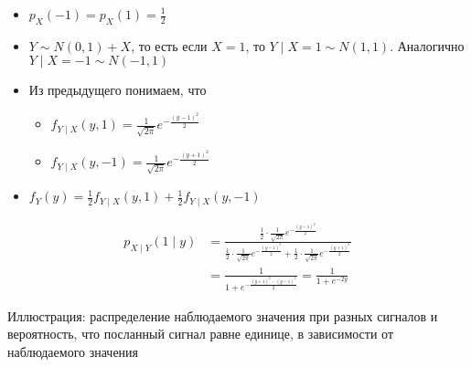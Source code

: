 \documentclass[12pt]{article}
\begin{document}
\begin{itemize}
  \item $p_X(-1) = p_X(1) = \frac{1}{2}$
  \item $Y \sim N(0, 1) + X$, то есть если $X = 1$, то $Y\mid X = 1 \sim N(1, 1)$. Аналогично $Y \mid X = -1 \sim N(-1, 1)$
  \item Из предыдущего понимаем, что 
  \begin{itemize}
    \item $f_{Y \mid X}(y, 1) = \frac{1}{\sqrt{2\pi}} e^{-\frac{(y - 1)^2}{2}}$
    \item $f_{Y \mid X}(y, -1) = \frac{1}{\sqrt{2\pi}} e^{-\frac{(y + 1)^2}{2}}$
  \end{itemize}
  \item $f_{Y}(y) = \frac{1}{2}f_{Y \mid X}(y, 1) + \frac{1}{2} f_{Y \mid X}(y, -1)$
\end{itemize}
\begin{align*}
  p_{X \mid Y}(1 \mid y) &= \frac{\frac{1}{2} \cdot \frac{1}{\sqrt{2\pi}} e^{-\frac{(y - 1)^2}{2}}}{\frac{1}{2} \cdot \frac{1}{\sqrt{2\pi}} e^{-\frac{(y - 1)^2}{2}} + \frac{1}{2} \cdot \frac{1}{\sqrt{2\pi}} e^{-\frac{(y + 1)^2}{2}}} \\
  &= \frac{1}{1 + e^{-\frac{(y + 1)^2 - (y - 1)^2}{2}}} = \frac{1}{1 + e^{-2y}}
\end{align*}

Иллюстрация: распределение наблюдаемого значения при разных сигналов и вероятность, что посланный сигнал равне единице, в зависимости от наблюдаемого значения

\begin{center}

\end{center}
\end{document}
